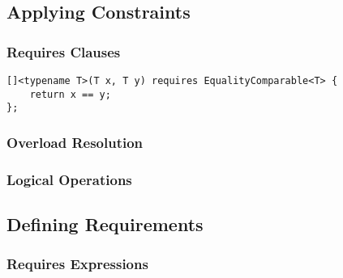 \subsection{Applying Constraints} \label{sec:applying_constraints}

    \subsubsection{Requires Clauses} \label{sec:requires_clauses}

        

        \begin{lstlisting}
[]<typename T>(T x, T y) requires EqualityComparable<T> {
    return x == y;
}; \end{lstlisting}

        

        

        

    \subsubsection{Overload Resolution} \label{sec:overload_resolution}

        

    \subsubsection{Logical Operations} \label{sec:logical_operations}

        

        

\subsection{Defining Requirements} \label{sec:defining_requirements}

    \subsubsection{Requires Expressions} \label{sec:requires_expressions}

